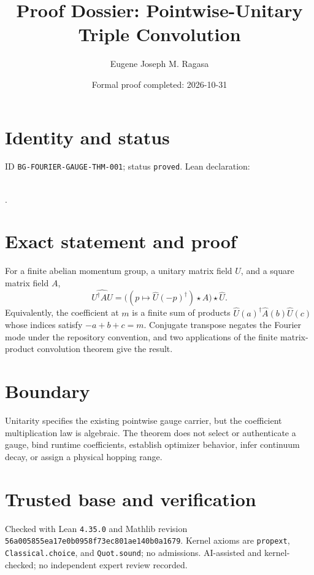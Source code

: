 \documentclass[11pt]{article}
\title{Proof Dossier: Pointwise-Unitary Triple Convolution}\author{Eugene Joseph M. Ragasa}\date{Formal proof completed: 2026-10-31}
\begin{document}
\maketitle
\section{Identity and status}
ID \texttt{BG-FOURIER-GAUGE-THM-001}; status \texttt{proved}. Lean declaration:
\par{}\\
{\tiny{}}.
\section{Exact statement and proof}
For a finite abelian momentum group, a unitary matrix field $U$, and a square matrix field $A$,
\[
 \widehat{U^\dagger A U}
 =\bigl((p\mapsto \widehat U(-p)^\dagger)\star\widehat A\bigr)\star\widehat U.
\]
Equivalently, the coefficient at $m$ is a finite sum of products
$\widehat U(a)^\dagger\widehat A(b)\widehat U(c)$ whose indices satisfy
$-a+b+c=m$. Conjugate transpose negates the Fourier mode under the repository convention, and two
applications of the finite matrix-product convolution theorem give the result.
\section{Boundary}
Unitarity specifies the existing pointwise gauge carrier, but the coefficient multiplication law is
algebraic. The theorem does not select or authenticate a gauge, bind runtime coefficients, establish
optimizer behavior, infer continuum decay, or assign a physical hopping range.
\section{Trusted base and verification}
Checked with Lean \texttt{4.35.0} and Mathlib revision
\texttt{56a005855ea17e0b0958f73ec801ae140b0a1679}. Kernel axioms are
\texttt{propext}, \texttt{Classical.choice}, and \texttt{Quot.sound}; no admissions.
AI-assisted and kernel-checked; no independent expert review recorded.
\end{document}
